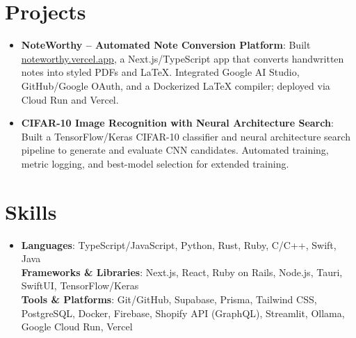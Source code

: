 \documentclass[letterpaper,11pt]{article}
\newcommand{\resumeItem}[2]{
  \item\small{
    \textbf{#1}{: #2 \vspace{-2pt}}
  }
}
\newcommand{\resumeSubItem}[2]{\resumeItem{#1}{#2}\vspace{-4pt}}
\newcommand{\resumeSubHeadingListStart}{\begin{itemize}[leftmargin=*]}
\newcommand{\resumeSubHeadingListEnd}{\end{itemize}}
\begin{document}
\section{Projects}
\resumeSubHeadingListStart
\resumeSubItem{NoteWorthy – Automated Note Conversion Platform}
{Built \href{https://noteworthy-git-main-giacomo-cappellettos-projects.vercel.app/}{noteworthy.vercel.app}, a Next.js/TypeScript app that converts handwritten notes into styled PDFs and LaTeX. Integrated Google AI Studio, GitHub/Google OAuth, and a Dockerized LaTeX compiler; deployed via Cloud Run and Vercel.}
\resumeSubItem{CIFAR-10 Image Recognition with Neural Architecture Search}
{Built a TensorFlow/Keras CIFAR-10 classifier and neural architecture search pipeline to generate and evaluate CNN candidates. Automated training, metric logging, and best-model selection for extended training.}
\resumeSubHeadingListEnd

\section{Skills}
\resumeSubHeadingListStart
\item{
            \textbf{Languages}{: TypeScript/JavaScript, Python, Rust, Ruby, C/C++, Swift, Java} \\
            \textbf{Frameworks \& Libraries}{: Next.js, React, Ruby on Rails, Node.js, Tauri, SwiftUI, TensorFlow/Keras} \\
            \textbf{Tools \& Platforms}{: Git/GitHub, Supabase, Prisma, Tailwind CSS, PostgreSQL, Docker, Firebase, Shopify API (GraphQL), Streamlit, Ollama, Google Cloud Run, Vercel}
      }
\resumeSubHeadingListEnd
\end{document}
